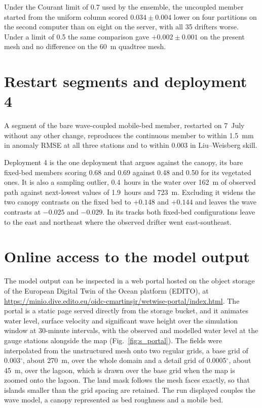 \documentclass[12pt]{article}
\begin{document}
Under the Courant limit of 0.7 used by the ensemble, the uncoupled member started
from the uniform column scored
$0.034 \pm 0.004$ lower on four partitions on the second computer than on eight
on the server, with all 35 drifters worse. Under a limit of 0.5 the same
comparison gave $+0.002 \pm 0.001$ on the present mesh and no difference on the
60~m quadtree mesh.

\section{Restart segments and deployment 4}
\label{sec:s_extra}

A segment of the bare wave-coupled mobile-bed member, restarted on 7~July
without any other change, reproduces the continuous member to within 1.5~mm in
anomaly RMSE at all three stations and to within 0.003 in Liu--Weisberg skill.

Deployment 4 is the one deployment that argues against the canopy, its bare
fixed-bed members scoring 0.68 and 0.69 against 0.48 and 0.50 for its vegetated
ones. It is also a sampling outlier, 0.4~hours in the water over 162~m of
observed path against next-lowest values of 1.9~hours and 723~m. Excluding it
widens the two canopy contrasts on the fixed bed to $+0.148$ and $+0.144$ and
leaves the wave contrasts at $-0.025$ and $-0.029$. In its tracks both
fixed-bed configurations leave to the east and northeast where the observed
drifter went east-southeast.

\section{Online access to the model output}
\label{sec:s_portal}

The model output can be inspected in a web portal hosted on the object storage
of the European Digital Twin of the Ocean platform (EDITO), at
\url{https://minio.dive.edito.eu/oidc-cmartinsjr/wetwise-portal/index.html}.
The portal is a static page served directly from the storage bucket, and it
animates water level, surface velocity and significant wave height over the
simulation window at 30-minute intervals, with the observed and modelled water
level at the gauge stations alongside the map (Fig.~\ref{fig:s_portal}). The
fields were interpolated from the unstructured mesh onto two regular grids, a
base grid of 0.003$^\circ$, about 270~m, over the whole domain and a detail
grid of 0.0005$^\circ$, about 45~m, over the lagoon, which is drawn over the
base grid when the map is zoomed onto the lagoon. The land mask follows the
mesh faces exactly, so that islands smaller than the grid spacing are
retained. The run displayed couples the wave model, a canopy represented as
bed roughness and a mobile bed.
\end{document}

